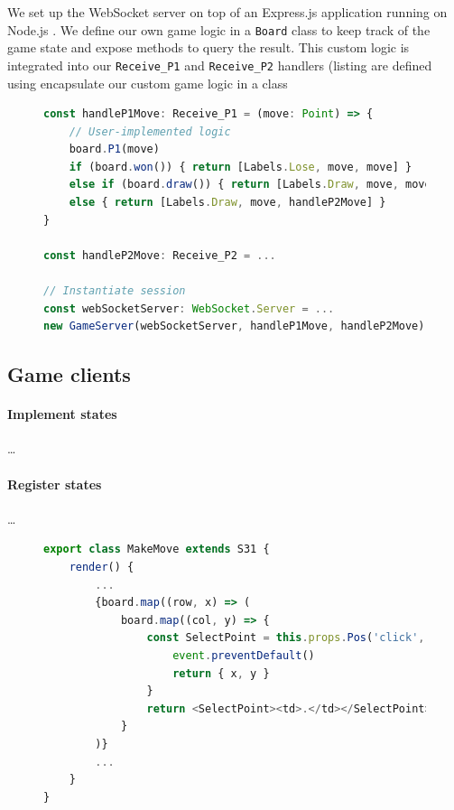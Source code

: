 \documentclass[submission,copyright,creativecommons]{eptcs}
\begin{document}
We set up the WebSocket server on top of an Express.js \cite{ExpressJS}application running on Node.js \cite{NodeJS}. We define our own game logic in a \texttt{Board} class to keep track of the game state and expose methods to query the result. This custom logic is integrated into our 
\texttt{Receive\_P1} and \texttt{Receive\_P2} handlers (listing are defined using 
encapsulate our custom game logic in a class 

\begin{figure}[!h]
\begin{lstlisting}[language=JavaScript, tabsize=4, title=\texttt{./app.ts}]
const handleP1Move: Receive_P1 = (move: Point) => {
	// User-implemented logic
	board.P1(move)
	if (board.won()) { return [Labels.Lose, move, move] }
	else if (board.draw()) { return [Labels.Draw, move, move] }
	else { return [Labels.Draw, move, handleP2Move] } 
}

const handleP2Move: Receive_P2 = ...

// Instantiate session
const webSocketServer: WebSocket.Server = ...
new GameServer(webSocketServer, handleP1Move, handleP2Move)
\end{lstlisting}  
\label{lst:svrprotocol}
\end{figure}


\subsection{Game clients}

\paragraph{Implement states} \dots

\paragraph{Register states} \dots

\begin{figure}[!h]
\begin{lstlisting}[language=JavaScript, tabsize=4]
export class MakeMove extends S31 {
	render() {
		...
		{board.map((row, x) => (
			board.map((col, y) => {
				const SelectPoint = this.props.Pos('click', event => {
					event.preventDefault()
					return { x, y }
				}
				return <SelectPoint><td>.</td></SelectPoint>
			}
		)}
		...
	}
}
\end{lstlisting}  
\label{lst:svrprotocol}
\end{figure}
\end{document}
